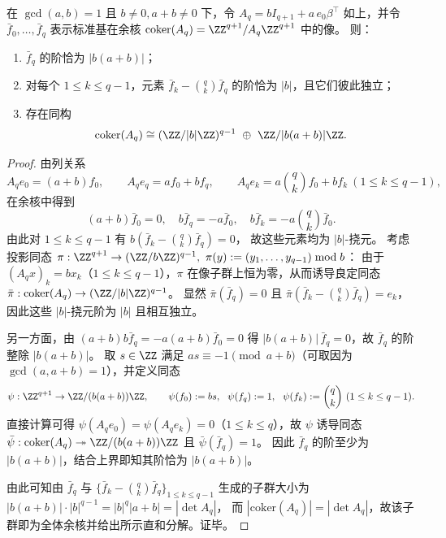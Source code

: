\begin{conclusion}\label{con:xi-terminal-replica-softcore-mq-ab-cokernel-splitting}
在 \(\gcd(a,b)=1\) 且 \(b\neq 0,a+b\neq 0\) 下，令
\(
A_q=bI_{q+1}+a\,e_0\beta^{\top}
\)
如上，并令 \(\bar f_0,\dots,\bar f_q\) 表示标准基在余核
\(
\mathrm{coker}(A_q)=\ZZ^{q+1}/A_q\ZZ^{q+1}
\)
中的像。
则：
\begin{enumerate}
  \item \(\bar f_q\) 的阶恰为 \(|b(a+b)|\)；
  \item 对每个 \(1\le k\le q-1\)，元素 \(\bar f_k-\binom{q}{k}\bar f_q\) 的阶恰为 \(|b|\)，且它们彼此独立；
  \item 存在同构
  \[
  \mathrm{coker}(A_q)\cong (\ZZ/|b|\ZZ)^{q-1}\ \oplus\ \ZZ/|b(a+b)|\ZZ.
  \]
\end{enumerate}
\end{conclusion}
\begin{proof}
由列关系
\[
A_q e_0=(a+b)f_0,\qquad
A_q e_q=af_0+bf_q,\qquad
A_q e_k=a\binom{q}{k}f_0+bf_k\ (1\le k\le q-1),
\]
在余核中得到
\[
(a+b)\bar f_0=0,\quad
b\bar f_q=-a\bar f_0,\quad
b\bar f_k=-a\binom{q}{k}\bar f_0.
\]
由此对 \(1\le k\le q-1\) 有
\(
b(\bar f_k-\binom{q}{k}\bar f_q)=0
\)，
故这些元素均为 \(|b|\)-挠元。
考虑投影同态
\(
\pi:\ZZ^{q+1}\to (\ZZ/b\ZZ)^{q-1},
\ \pi(y):=(y_1,\dots,y_{q-1})\bmod b
\)：
由于 \((A_qx)_k=bx_k\)（\(1\le k\le q-1\)），\(\pi\) 在像子群上恒为零，从而诱导良定同态
\(
\bar\pi:\mathrm{coker}(A_q)\to(\ZZ/|b|\ZZ)^{q-1}
\)。
显然 \(\bar\pi(\bar f_q)=0\) 且 \(\bar\pi(\bar f_k-\binom{q}{k}\bar f_q)=e_k\)，因此这些 \(|b|\)-挠元阶为 \(|b|\) 且相互独立。
\par
另一方面，由 \((a+b)b\bar f_q=-a(a+b)\bar f_0=0\) 得 \(|b(a+b)|\,\bar f_q=0\)，故 \(\bar f_q\) 的阶整除 \(|b(a+b)|\)。
取 \(s\in\ZZ\) 满足 \(as\equiv -1\pmod{a+b}\)（可取因为 \(\gcd(a,a+b)=1\)），并定义同态
\[
\psi:\ZZ^{q+1}\to \ZZ/(b(a+b))\ZZ,\qquad
\psi(f_0):=bs,\ \ \psi(f_q):=1,\ \ \psi(f_k):=\binom{q}{k}\ (1\le k\le q-1).
\]
直接计算可得 \(\psi(A_qe_0)=\psi(A_qe_k)=0\)（\(1\le k\le q\)），故 \(\psi\) 诱导同态
\(
\bar\psi:\mathrm{coker}(A_q)\twoheadrightarrow \ZZ/(b(a+b))\ZZ
\)
且 \(\bar\psi(\bar f_q)=1\)。
因此 \(\bar f_q\) 的阶至少为 \(|b(a+b)|\)，结合上界即知其阶恰为 \(|b(a+b)|\)。
\par
由此可知由 \(\bar f_q\) 与 \(\{\bar f_k-\binom{q}{k}\bar f_q\}_{1\le k\le q-1}\) 生成的子群大小为
\(
|b(a+b)|\cdot |b|^{q-1}=|b|^{q}|a+b|=|\det A_q|
\)，
而 \(|\mathrm{coker}(A_q)|=|\det A_q|\)，故该子群即为全体余核并给出所示直和分解。证毕。
\end{proof}

